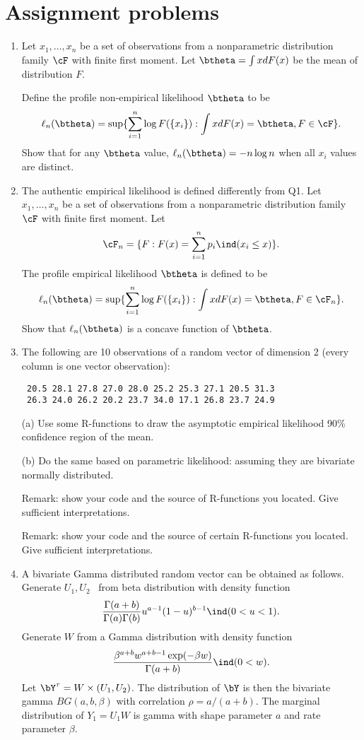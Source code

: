 \section{Assignment problems}
\begin{enumerate}
\item
Let $x_1, \ldots, x_n$ be a set of \iid observations from a nonparametric
distribution family $\cF$ with finite first moment.
Let $\btheta = \int x dF(x)$ be the mean of distribution $F$.

Define the profile non-empirical likelihood $\btheta$ to be
\[
\ell_n(\btheta) = \sup \{ \sum_{i=1}^n \log F(\{x_i\}): \int x dF(x) = \btheta, F \in \cF \}.
\]
Show that for any $\btheta$ value, $\ell_n(\btheta) = - n \log n$
when all $x_i$ values are distinct.


\item
The authentic empirical likelihood is defined differently from Q1.
Let $x_1, \ldots, x_n$ be a set of \iid observations from a nonparametric
distribution family $\cF$ with finite first moment.
Let 
\[
\cF_n = \{ F: F(x) = \sum_{i=1}^n p_i \ind(x_i \leq x)\}.
\]
The profile empirical likelihood $\btheta$ is defined to be
\[
\ell_n(\btheta) = \sup \{ \sum_{i=1}^n \log F(\{x_i\}): \int x dF(x) = \btheta, F \in \cF_n \}.
\]
Show that $\ell_n(\btheta)$ is a concave function of $\btheta$.


\item
The following are 10 \iid observations of a random vector of dimension 2
(every column is one vector observation):
\begin{verbatim}
 20.5 28.1 27.8 27.0 28.0 25.2 25.3 27.1 20.5 31.3
 26.3 24.0 26.2 20.2 23.7 34.0 17.1 26.8 23.7 24.9
\end{verbatim}

(a) 
Use some R-functions to draw the asymptotic empirical likelihood 90\% 
confidence region of the mean.

(b) 
Do the same based on parametric likelihood: assuming they
are bivariate normally distributed.

Remark: show your code and the source of R-functions you
located. Give sufficient interpretations.

Remark: show your code and the source of certain R-functions you
located. Give sufficient interpretations.

\item
A bivariate Gamma distributed random vector can be obtained as follows. 
Generate $U_1, U_2$ \iid\  from beta distribution
with density function
$$
\frac{\Gamma(a+b)}{\Gamma(a)\Gamma(b)}u^{a-1}(1-u)^{b-1} \ind(0 < u < 1).
$$
Generate $W$ from a Gamma distribution with density function
$$
\frac{\beta^{a+b}w^{a+b-1}\exp(-\beta w)}{\Gamma(a+b)} \ind ( 0 < w).
$$
Let $\bY^\tau  =W \times (U_1, U_2)$.
The distribution of $\bY$ is then the bivariate gamma
$BG(a, b, \beta)$ with correlation $\rho=a/(a+b)$.
The marginal distribution of $Y_1 = U_1W$ is gamma with 
shape parameter $a$ and rate parameter $\beta$.


\end{enumerate}
